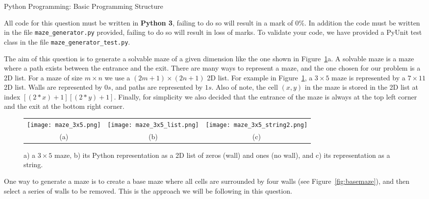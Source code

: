 \documentclass[final]{UoYClosedExam}
\begin{document}
\newpage


\begin{question}{40}{Python Programming: Basic Programming Structure}

{All code for this question must be written in \textbf{Python 3}, failing to do so will result in a mark of 0\%. In addition the code must be written in the file \verb|maze_generator.py| provided, failing to do so will result in loss of marks. To validate your code, we have provided a PyUnit test class in the file \verb|maze_generator_test.py|.}%

The aim of this question is to generate a solvable maze of a given dimension like the one shown in Figure~\ref{fig:maze}a. A solvable maze is a maze where a path exists between the entrance and the exit. There are many ways to represent a maze, and the one chosen for our problem is a 2D list. For a maze of size $m \times n$ we use a $(2m+1) \times (2n+1)$ 2D list. For example in Figure~\ref{fig:maze}, a $3\times 5$ maze is represented by a $7\times 11$ 2D list. Walls are represented by $0s$, and paths are represented by $1s$. Also of note, the cell $(x,y)$ in the maze is stored in the 2D list at index $[(2*x)+1][(2*y)+1]$. Finally, for simplicity we also decided that the entrance of the maze is always at the top left corner and the exit at the bottom right corner.



\begin{figure}[ht]%
\begin{center}
\begin{tabular}{ccc}
\texttt{[image: maze\_3x5.png]} &
\texttt{[image: maze\_3x5\_list.png]} &
\texttt{[image: maze\_3x5\_string2.png]} \\
(a) & (b) & (c)
\end{tabular}
\end{center}

\caption{a) a $3\times5$ maze, b) its Python representation as a 2D list of zeros (wall) and ones (no wall), and c) its representation as a string.}%
\label{fig:maze}%
\end{figure}


One way to generate a maze is to create a base maze where all cells are surrounded by four walls (see Figure~\ref{fig:basemaze}), and then select a series of walls to be removed. This is the approach we will be following in this question.


\end{question}
\end{document}
